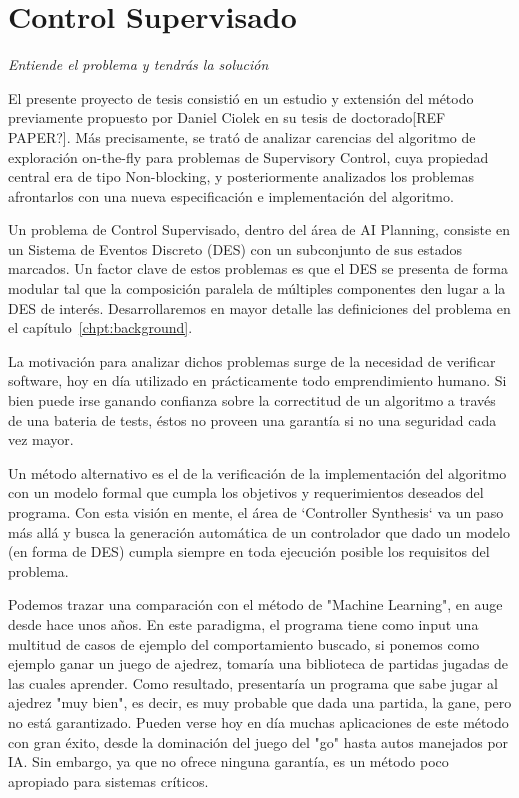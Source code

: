 \section{Control Supervisado}
{\begin{small}%
\begin{flushright}%
\it
Entiende el problema y tendrás la solución
\end{flushright}%
\end{small}%
\vspace{.5cm}}
El presente proyecto de tesis consistió en un estudio y extensión del método previamente propuesto por Daniel Ciolek en su tesis de doctorado[REF PAPER?]. Más precisamente, se trató de analizar carencias del algoritmo de exploración on-the-fly para problemas de Supervisory Control, cuya propiedad central era de tipo Non-blocking, y posteriormente analizados los problemas afrontarlos con una nueva especificación e implementación del algoritmo.

Un problema de Control Supervisado, dentro del área de AI Planning, consiste en un Sistema de Eventos Discreto (DES) con un subconjunto de sus estados marcados. Un factor clave de estos problemas es que el DES se presenta de forma modular tal que la composición paralela de múltiples componentes den lugar a la DES de interés. Desarrollaremos en mayor detalle las definiciones del problema en el capítulo~\ref{chpt:background}.

La motivación para analizar dichos problemas surge de la necesidad de verificar software, hoy en día utilizado en prácticamente todo emprendimiento humano. Si bien puede irse ganando confianza sobre la correctitud de un algoritmo a través de una bateria de tests, éstos no proveen una garantía si no una seguridad cada vez mayor. 

Un método alternativo es el de la verificación de la implementación del algoritmo con un modelo formal que cumpla los objetivos y requerimientos deseados del programa. Con esta visión en mente, el área de `Controller Synthesis` va un paso más allá y busca la generación automática de un controlador que dado un modelo (en forma de DES) cumpla siempre en toda ejecución posible los requisitos del problema.

Podemos trazar una comparación con el método de "Machine Learning", en auge desde hace unos años. En este paradigma, el programa tiene como input una multitud de casos de ejemplo del comportamiento buscado, si ponemos como ejemplo ganar un juego de ajedrez, tomaría una biblioteca de partidas jugadas de las cuales aprender. Como resultado, presentaría un programa que sabe jugar al ajedrez "muy bien", es decir, es muy probable que dada una partida, la gane, pero no está garantizado. Pueden verse hoy en día muchas aplicaciones de este método con gran éxito, desde la dominación del juego del "go" hasta autos manejados por IA. Sin embargo, ya que no ofrece ninguna garantía, es un método poco apropiado para sistemas críticos.

